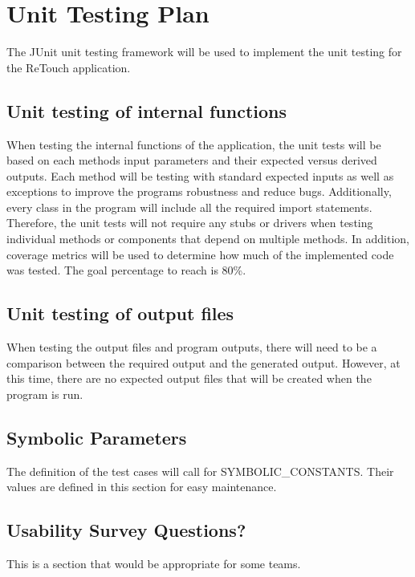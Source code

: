 \documentclass[12pt, titlepage]{article}
\begin{document}
\section{Unit Testing Plan}

The JUnit unit testing framework will be used to implement the unit testing for the ReTouch application.
		
\subsection{Unit testing of internal functions}

When testing the internal functions of the application, the unit tests will be based on each methods input parameters and their expected versus derived outputs. Each method will be testing with standard expected inputs as well as exceptions to improve the programs robustness and reduce bugs. Additionally, every class in the program will include all the required import statements. Therefore, the unit tests will not require any stubs or drivers when testing individual methods or components that depend on multiple methods. In addition, coverage metrics will be used to determine how much of the implemented code was tested. The goal percentage to reach is 80\%. 
		
\subsection{Unit testing of output files}

When testing the output files and program outputs, there will need to be a comparison between the required output and the generated output. However, at this time, there are no expected output files that will be created when the program is run. 		





\newpage

\subsection{Symbolic Parameters}

The definition of the test cases will call for SYMBOLIC\_CONSTANTS.
Their values are defined in this section for easy maintenance.

\subsection{Usability Survey Questions?}

This is a section that would be appropriate for some teams.
\end{document}
